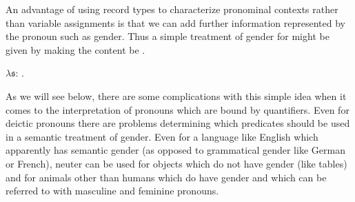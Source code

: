 An advantage of using record types to characterize pronominal contexts
rather than variable assignments is that we can add further
information represented by the pronoun such as gender.   Thus a simple
treatment of gender for \preveg{} might be given by making the content
be \nexteg{}.
\begin{ex} 
$\lambda\mathfrak{s}$:
                                 . 
\end{ex} 
As we will see below, there are some complications with this simple
idea when it comes to the interpretation of pronouns which are bound
by quantifiers.  Even for deictic pronouns there are problems
determining which predicates should be used in a semantic treatment of
gender.  Even for a language like English which apparently has
semantic gender (as opposed to grammatical gender like German or
French), neuter can be used for objects which do not have gender (like
tables) and for animals other than humans which do have gender and
which can be referred to with masculine and feminine pronouns.



 
 
